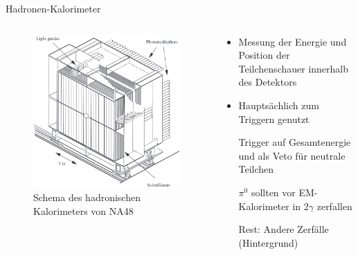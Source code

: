 \documentclass[aspectratio=1610, professionalfonts, 9pt, t]{beamer}
\begin{document}
  \begin{frame}{Hadronen-Kalorimeter} %
    \begin{columns}[onlytextwidth]
      \begin{column}{0.4\textwidth}
        \begin{figure}[ht]
          \begin{center}
            \includegraphics[height=0.7\textheight]{Images/na48hac.png} %
            \caption{Schema des hadronischen Kalorimeters von NA48}
          \end{center}
        \end{figure}
      \end{column}
      \begin{column}{0.5\textwidth}
        \begin{itemize}
          \item Messung der Energie und Position der Teilchenschauer innerhalb des Detektors
          \item Hauptsächlich zum Triggern genutzt
          \item[\rightarrow] Trigger auf Gesamtenergie und als Veto für neutrale Teilchen
          \item[\rightarrow] $\pi^0$ sollten vor EM-Kalorimeter in $2\gamma$ zerfallen
          \item[Rest:] Andere Zerfälle (Hintergrund)
        \end{itemize}
      \end{column}
    \end{columns}
  \end{frame}
\end{document}

